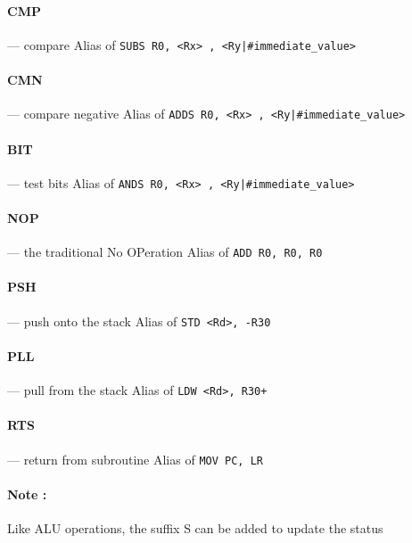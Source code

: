 \documentclass[11pt]{article}
\begin{document}
\paragraph{CMP} --- compare\newline
Alias of \texttt{SUBS R0, <Rx> , <Ry|\#immediate\_value> }

\paragraph{CMN} --- compare negative\newline
Alias of \texttt{ADDS R0, <Rx> , <Ry|\#immediate\_value> }

\paragraph{BIT} --- test bits\newline
Alias of \texttt{ANDS R0, <Rx> , <Ry|\#immediate\_value> }

\paragraph{NOP} --- the traditional No OPeration\newline
Alias of \texttt{ADD R0, R0, R0}

\paragraph{PSH} --- push onto the stack\newline
Alias of \texttt{STD <Rd>, -R30}

\paragraph{PLL} --- pull from the stack\newline
Alias of \texttt{LDW <Rd>, R30+}

\paragraph{RTS} --- return from subroutine\newline
Alias of \texttt{MOV PC, LR}

\paragraph{Note : }

Like ALU operations, the suffix S can be added to update the status
\end{document}
